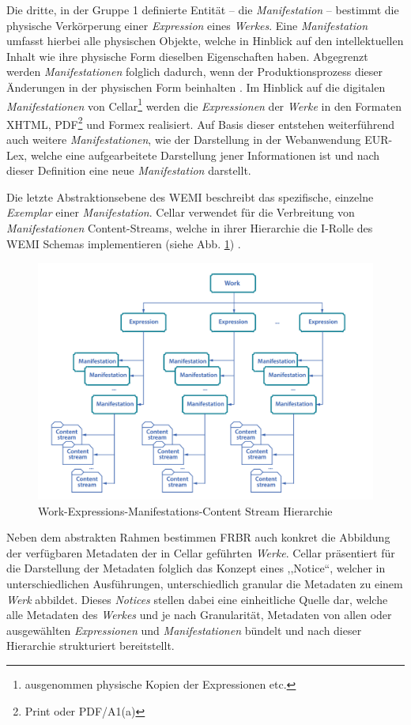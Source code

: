     \medskip
    Die dritte, in der Gruppe 1 definierte Entität -- die \textit{Manifestation} -- bestimmt die physische Verkörperung einer \textit{Expression} eines \textit{Werkes}.
    Eine \textit{Manifestation} umfasst hierbei alle physischen Objekte, welche in Hinblick auf den intellektuellen Inhalt wie ihre physische Form dieselben Eigenschaften haben.
    Abgegrenzt werden \textit{Manifestationen} folglich dadurch, wenn der Produktionsprozess dieser Änderungen in der physischen Form beinhalten \cite[S. 20f]{eu_frbr}.
    Im Hinblick auf die digitalen \textit{Manifestationen} von Cellar\footnote{ausgenommen physische Kopien der Expressionen etc.} werden die \textit{Expressionen} der \textit{Werke} in den Formaten XHTML, PDF\footnote{Print oder PDF/A1(a)} und Formex realisiert. 
    Auf Basis dieser entstehen weiterführend auch weitere \textit{Manifestationen}, wie der Darstellung in der Webanwendung EUR-Lex, welche eine aufgearbeitete Darstellung jener Informationen ist und nach dieser Definition eine neue \textit{Manifestation} darstellt.
    
    
    \medskip
    Die letzte Abstraktionsebene des \acs{WEMI} beschreibt das spezifische, einzelne \textit{Exemplar} einer \textit{Manifestation}. \cite[22]{eu_frbr}
    Cellar verwendet für die Verbreitung von \textit{Manifestationen} Content-Streams, welche in ihrer Hierarchie die I-Rolle des \ac{WEMI} Schemas implementieren (siehe Abb. \ref{fig:eu_wemi}) \cite[29]{eu_cellar}. 
    
    \begin{figure}[H]
        \centering
        \includegraphics[width=0.625\linewidth]{gfx/content_modell.png}
        \caption{Work-Expressions-Manifestations-Content Stream Hierarchie}
        \label{fig:eu_wemi}
    \end{figure}
    
    \noindent
    Neben dem abstrakten Rahmen bestimmen \acs{FRBR} auch konkret die Abbildung der verfügbaren Metadaten der in Cellar geführten \textit{Werke}.
    Cellar präsentiert für die Darstellung der Metadaten folglich das Konzept eines ,,Notice``, welcher in unterschiedlichen Ausführungen, unterschiedlich granular die Metadaten zu einem \textit{Werk} abbildet.
    Dieses \textit{Notices} stellen dabei eine einheitliche Quelle dar, welche alle Metadaten des \textit{Werkes} und je nach Granularität, Metadaten von allen oder ausgewählten \textit{Expressionen} und \textit{Manifestationen} bündelt und nach dieser Hierarchie strukturiert bereitstellt.
    \cite[S. 31f]{eu_cellar}

